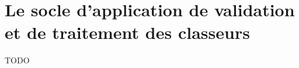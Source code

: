 \section{Le socle d'application de validation et de traitement des classeurs}
\label{sec:spreadsheet-framework}
TODO